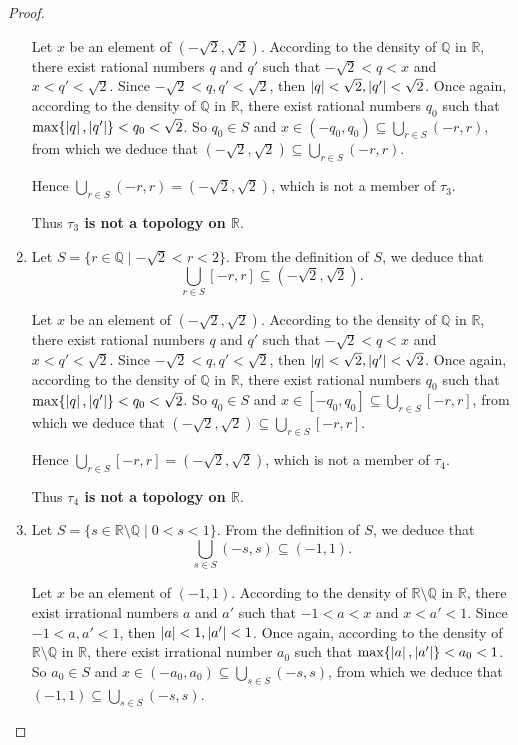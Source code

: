 \begin{proof}
\begin{enumerate}[label={(\roman*)}]
              Let $x$ be an element of $(-\sqrt{2}, \sqrt{2})$. According to the density of $\mathbb{Q}$ in $\mathbb{R}$, there exist rational numbers $q$ and $q'$ such that $-\sqrt{2} < q < x$ and $x < q' < \sqrt{2}$. Since $-\sqrt{2} < q, q' < \sqrt{2}$, then $\left\vert{q}\right\vert < \sqrt{2}, \left\vert{q'}\right\vert < \sqrt{2}$. Once again, according to the density of $\mathbb{Q}$ in $\mathbb{R}$, there exist rational numbers $q_{0}$ such that $\max\{ \left\vert{q}\right\vert, \left\vert{q'}\right\vert \} < q_{0} < \sqrt{2}$. So $q_{0}\in S$ and $x\in (-q_{0}, q_{0})\subseteq \bigcup_{r\in S} (-r, r)$, from which we deduce that $(-\sqrt{2}, \sqrt{2})\subseteq \bigcup_{r\in S}(-r, r)$.

              Hence $\bigcup_{r\in S} (-r, r) = (-\sqrt{2}, \sqrt{2})$, which is not a member of $\tau_{3}$.

              Thus \textbf{$\tau_{3}$ is not a topology on $\mathbb{R}$}.
        \item Let $S = \{ r\in\mathbb{Q} \mid -\sqrt{2} < r < 2 \}$. From the definition of $S$, we deduce that
              \[
                  \bigcup_{r\in S} [-r, r]\subseteq (-\sqrt{2}, \sqrt{2}).
              \]

              Let $x$ be an element of $(-\sqrt{2}, \sqrt{2})$. According to the density of $\mathbb{Q}$ in $\mathbb{R}$, there exist rational numbers $q$ and $q'$ such that $-\sqrt{2} < q < x$ and $x < q' < \sqrt{2}$. Since $-\sqrt{2} < q, q' < \sqrt{2}$, then $\left\vert{q}\right\vert < \sqrt{2}, \left\vert{q'}\right\vert < \sqrt{2}$. Once again, according to the density of $\mathbb{Q}$ in $\mathbb{R}$, there exist rational numbers $q_{0}$ such that $\max\{ \left\vert{q}\right\vert, \left\vert{q'}\right\vert \} < q_{0} < \sqrt{2}$. So $q_{0}\in S$ and $x\in [-q_{0}, q_{0}]\subseteq \bigcup_{r\in S} [-r, r]$, from which we deduce that $(-\sqrt{2}, \sqrt{2})\subseteq \bigcup_{r\in S}[-r, r]$.

              Hence $\bigcup_{r\in S} [-r, r] = (-\sqrt{2}, \sqrt{2})$, which is not a member of $\tau_{4}$.

              Thus \textbf{$\tau_{4}$ is not a topology on $\mathbb{R}$}.
        \item Let $S = \{ s\in\mathbb{R}\setminus\mathbb{Q} \mid 0 < s < 1 \}$. From the definition of $S$, we deduce that
              \[
                  \bigcup_{s\in S} (-s, s)\subseteq (-1, 1).
              \]

              Let $x$ be an element of $(-1, 1)$. According to the density of $\mathbb{R}\setminus\mathbb{Q}$ in $\mathbb{R}$, there exist irrational numbers $a$ and $a'$ such that $-1 < a < x$ and $x < a' < 1$. Since $-1 < a, a' < 1$, then $\left\vert{a}\right\vert < 1, \left\vert{a'}\right\vert < 1$. Once again, according to the density of $\mathbb{R}\setminus\mathbb{Q}$ in $\mathbb{R}$, there exist irrational number $a_{0}$ such that $\max\{ \left\vert{a}\right\vert, \left\vert{a'}\right\vert \} < a_{0} < 1$. So $a_{0}\in S$ and $x\in (-a_{0}, a_{0})\subseteq \bigcup_{s\in S} (-s, s)$, from which we deduce that $(-1, 1)\subseteq \bigcup_{s\in S}(-s, s)$.


\end{enumerate}
\end{proof}
